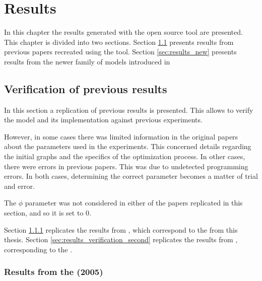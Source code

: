 \chapter{Results}
\label{cha:results}


In this chapter the results generated with the open source tool are presented.
This chapter is divided into two sections.
Section \ref{sec:results_verification} presents results from previous papers recreated using the tool.
Section \ref{sec:results_new} presents results from the newer family of models introduced in \cite{Ferrer2018a}

\section{Verification of previous results}
\label{sec:results_verification}

In this section a replication of previous results is presented.
This allows to verify the model and its implementation against previous experiments.

However, in some cases there was limited information in the original papers about the parameters used in the experiments.
This concerned details regarding the initial graphs and the specifics of the optimization process.
In other cases, there were errors in previous papers.
This was due to undetected programming errors.
In both cases, determining the correct parameter becomes a matter of trial and error.

The $\phi$ parameter was not considered in either of the papers replicated in this section, and so it is set to 0.

Section \ref{sec:results_verification_first} replicates the results from \cite{Ferrer2005a}, which correspond to the \firstmodel{} from this thesis.
Section \ref{sec:results_verification_second} replicates the results from \cite{Ferrer2003a}, corresponding to the \secondmodel{}.

\subsection{Results from the \firstmodel{} (2005)}
\label{sec:results_verification_first}

